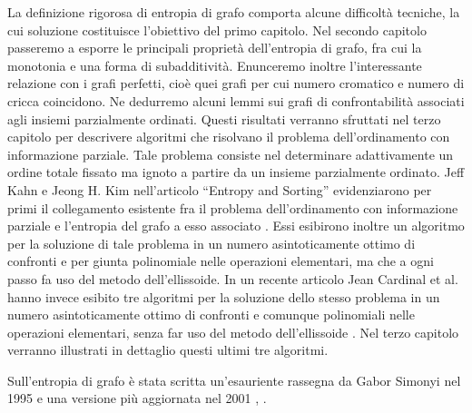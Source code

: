 La definizione rigorosa di entropia di grafo comporta alcune difficoltà tecniche, la cui soluzione costituisce l'obiettivo del primo capitolo. Nel secondo capitolo passeremo a esporre le principali proprietà dell'entropia di grafo, fra cui la monotonia e una forma di subadditività. Enunceremo inoltre l'interessante relazione con i grafi perfetti, cioè quei grafi per cui numero cromatico e numero di cricca coincidono. Ne dedurremo alcuni lemmi sui grafi di confrontabilità associati agli insiemi parzialmente ordinati. Questi risultati verranno sfruttati nel terzo capitolo per descrivere algoritmi che risolvano il problema dell'ordinamento con informazione parziale. Tale problema consiste nel determinare adattivamente un ordine totale fissato ma ignoto a partire da un insieme parzialmente ordinato. Jeff Kahn e Jeong H. Kim nell'articolo ``Entropy and Sorting'' evidenziarono per primi il collegamento esistente fra il problema dell'ordinamento con informazione parziale e l'entropia del grafo a esso associato \cite{Kahn1995}. Essi esibirono inoltre un algoritmo per la soluzione di tale problema in un numero asintoticamente ottimo di confronti e per giunta polinomiale nelle operazioni elementari, ma che a ogni passo fa uso del metodo dell'ellissoide. In un recente articolo Jean Cardinal et al. hanno invece esibito tre algoritmi per la soluzione dello stesso problema in un numero asintoticamente ottimo di confronti e comunque polinomiali nelle operazioni elementari, senza far uso del metodo dell'ellissoide \cite{Cardinal2010}. Nel terzo capitolo verranno illustrati in dettaglio questi ultimi tre algoritmi.

Sull'entropia di grafo è stata scritta un'esauriente rassegna da Gabor Simonyi nel 1995 e una versione più aggiornata nel 2001 \cite{Simonyi1995}, \cite{Simonyi2001}.
